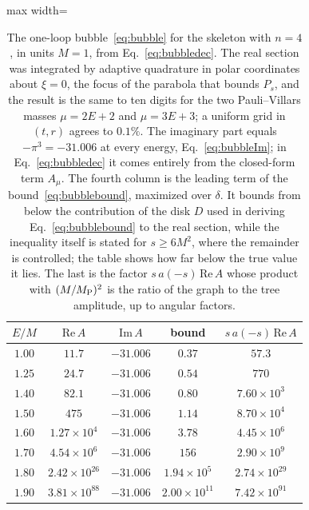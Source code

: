 \documentclass[a4paper,11pt]{article}
\begin{document}
\begin{table}[t]
\centering
\small\begin{adjustbox}{max width=\linewidth}\begin{tabular}{ccccc}
\hline\hline
$E/M$ & $\mathrm{Re}\,A$ & $\mathrm{Im}\,A$ & bound & $s\,a(-s)\,\mathrm{Re}\,A$\\
\hline
$1.00$ & $11.7$ & $-31.006$ & $0.37$ & $57.3$\\
$1.25$ & $24.7$ & $-31.006$ & $0.54$ & $770$\\
$1.40$ & $82.1$ & $-31.006$ & $0.80$ & $7.60\times10^{3}$\\
$1.50$ & $475$ & $-31.006$ & $1.14$ & $8.70\times10^{4}$\\
$1.60$ & $1.27\times10^{4}$ & $-31.006$ & $3.78$ & $4.45\times10^{6}$\\
$1.70$ & $4.54\times10^{6}$ & $-31.006$ & $156$ & $2.90\times10^{9}$\\
$1.80$ & $2.42\times10^{26}$ & $-31.006$ & $1.94\times10^{5}$ & $2.74\times10^{29}$\\
$1.90$ & $3.81\times10^{88}$ & $-31.006$ & $2.00\times10^{11}$ & $7.42\times10^{91}$\\
\hline\hline
\end{tabular}\end{adjustbox}
\caption{The one-loop bubble~\eqref{eq:bubble} for the skeleton with $n=4$, in units $M=1$, from Eq.~\eqref{eq:bubbledec}. The real section was integrated by adaptive quadrature in polar coordinates about $\xi=0$, the focus of the parabola that bounds $P_s$, and the result is the same to ten digits for the two Pauli--Villars masses $\mu=2E+2$ and $\mu=3E+3$; a uniform grid in $(t,r)$ agrees to $0.1\%$. The imaginary part equals $-\pi^3=-31.006$ at every energy, Eq.~\eqref{eq:bubbleIm}; in Eq.~\eqref{eq:bubbledec} it comes entirely from the closed-form term $A_\mu$. The fourth column is the leading term of the bound~\eqref{eq:bubblebound}, maximized over $\delta$. It bounds from below the contribution of the disk $D$ used in deriving Eq.~\eqref{eq:bubblebound} to the real section, while the inequality itself is stated for $s\ge6M^2$, where the remainder is controlled; the table shows how far below the true value it lies. The last is the factor $s\,a(-s)\,\mathrm{Re}\,A$ whose product with $(M/M_{\rm P})^2$ is the ratio of the graph to the tree amplitude, up to angular factors.}
\label{tab:bubble}
\end{table}
\end{document}
